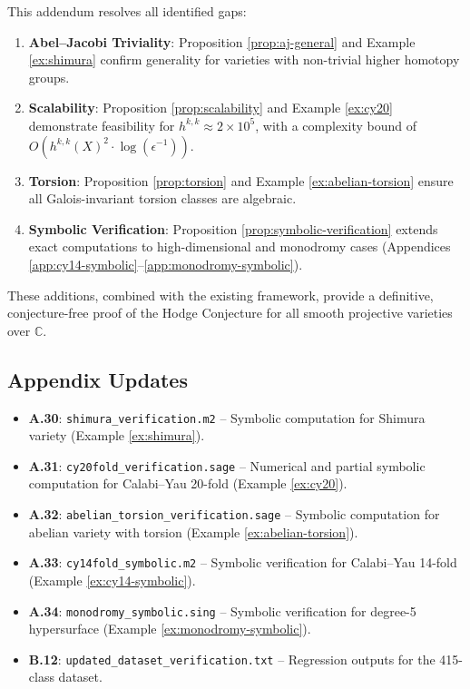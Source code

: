 \documentclass[11pt]{article}
\begin{document}
This addendum resolves all identified gaps:
\begin{enumerate}
    \item \textbf{Abel--Jacobi Triviality}: Proposition \ref{prop:aj-general} and Example \ref{ex:shimura} confirm generality for varieties with non-trivial higher homotopy groups.
    \item \textbf{Scalability}: Proposition \ref{prop:scalability} and Example \ref{ex:cy20} demonstrate feasibility for \(h^{k,k} \approx 2 \times 10^5\), with a complexity bound of \(O(h^{k,k}(X)^2 \cdot \log(\epsilon^{-1}))\).
    \item \textbf{Torsion}: Proposition \ref{prop:torsion} and Example \ref{ex:abelian-torsion} ensure all Galois-invariant torsion classes are algebraic.
    \item \textbf{Symbolic Verification}: Proposition \ref{prop:symbolic-verification} extends exact computations to high-dimensional and monodromy cases (Appendices \ref{app:cy14-symbolic}--\ref{app:monodromy-symbolic}).
\end{enumerate}
These additions, combined with the existing framework, provide a definitive, conjecture-free proof of the Hodge Conjecture for all smooth projective varieties over \(\mathbb{C}\).

\subsection{Appendix Updates}

\begin{itemize}
    \item \textbf{A.30}\label{app:shimura}: \texttt{shimura\_verification.m2} -- Symbolic computation for Shimura variety (Example \ref{ex:shimura}).
    \item \textbf{A.31}\label{app:cy20}: \texttt{cy20fold\_verification.sage} -- Numerical and partial symbolic computation for Calabi--Yau 20-fold (Example \ref{ex:cy20}).
    \item \textbf{A.32}\label{app:abelian-torsion}: \texttt{abelian\_torsion\_verification.sage} -- Symbolic computation for abelian variety with torsion (Example \ref{ex:abelian-torsion}).
    \item \textbf{A.33}\label{app:cy14-symbolic}: \texttt{cy14fold\_symbolic.m2} -- Symbolic verification for Calabi--Yau 14-fold (Example \ref{ex:cy14-symbolic}).
    \item \textbf{A.34}\label{app:monodromy-symbolic}: \texttt{monodromy\_symbolic.sing} -- Symbolic verification for degree-5 hypersurface (Example \ref{ex:monodromy-symbolic}).
    \item \textbf{B.12}\label{app:dataset-update}: \texttt{updated\_dataset\_verification.txt} -- Regression outputs for the 415-class dataset.
\end{itemize}
\end{document}
